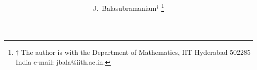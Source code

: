 \documentclass[journal,12pt,onecolumn]{IEEEtran}
\begin{document}
\providecommand{\nCr}[2]{\,^{#1}C_{#2}} %
\providecommand{\nPr}[2]{\,^{#1}P_{#2}} %
\providecommand{\mbf}{\mathbf}
\providecommand{\pr}[1]{\ensuremath{\Pr\left(#1\right)}}
\providecommand{\qfunc}[1]{\ensuremath{Q\left(#1\right)}}
\providecommand{\sbrak}[1]{\ensuremath{{}\left[#1\right]}}
\providecommand{\lsbrak}[1]{\ensuremath{{}\left[#1\right.}}
\providecommand{\rsbrak}[1]{\ensuremath{{}\left.#1\right]}}
\providecommand{\brak}[1]{\ensuremath{\left(#1\right)}}
\providecommand{\lbrak}[1]{\ensuremath{\left(#1\right.}}
\providecommand{\rbrak}[1]{\ensuremath{\left.#1\right)}}
\providecommand{\cbrak}[1]{\ensuremath{\left\{#1\right\}}}
\providecommand{\lcbrak}[1]{\ensuremath{\left\{#1\right.}}
\providecommand{\rcbrak}[1]{\ensuremath{\left.#1\right\}}}
\newcommand{\sgn}{\mathop{\mathrm{sgn}}}
\providecommand{\abs}[1]{\left\vert#1\right\vert}
\providecommand{\res}[1]{\Res\displaylimits_{#1}} 
\providecommand{\norm}[1]{\lVert#1\rVert}
\providecommand{\mtx}[1]{\mathbf{#1}}
\providecommand{\mean}[1]{E\left[ #1 \right]}
\providecommand{\fourier}{\overset{\mathcal{F}}{ \rightleftharpoons}}
\providecommand{\system}{\overset{\mathcal{H}}{ \longleftrightarrow}}

\newcommand{\solution}{\noindent \textbf{Solution: }}
\providecommand{\dec}[2]{\ensuremath{\overset{#1}{\underset{#2}{\gtrless}}}}
\title{ 
}
\author{J.~Balasubramaniam$^{\dagger}$ %
\thanks{$\dagger$ The author is with the Department of Mathematics, IIT Hyderabad
502285 India e-mail: jbala@iith.ac.in. }
}
\maketitle
\end{document}
